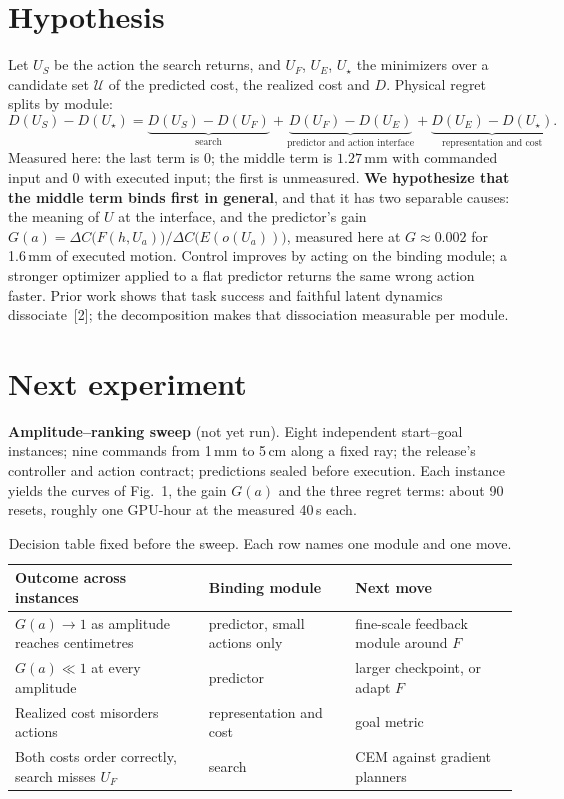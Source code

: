 \documentclass[10pt]{article}
\newcommand{\U}{\mathcal U}
\begin{document}
\section{Hypothesis}
Let $U_S$ be the action the search returns, and $U_F$, $U_E$, $U_\star$ the minimizers over a candidate set $\U$
of the predicted cost, the realized cost and $D$. Physical regret splits by module:
\begin{equation*}
D(U_S)-D(U_\star)=
\underbrace{D(U_S)-D(U_F)}_{\text{search}}
+\underbrace{D(U_F)-D(U_E)}_{\text{predictor and action interface}}
+\underbrace{D(U_E)-D(U_\star)}_{\text{representation and cost}} .
\end{equation*}
Measured here: the last term is $0$; the middle term is $1.27$\,mm with commanded input and $0$ with
executed input; the first is unmeasured. \textbf{We hypothesize that the middle term binds first in general}, and
that it has two separable causes: the meaning of $U$ at the interface, and the predictor's gain $G(a)=\Delta C\big(F(h,U_a)\big)\big/\Delta C\big(E(o(U_a))\big)$, measured here at $G\approx0.002$ for 1.6\,mm of executed motion.
Control improves by acting on the binding module; a stronger optimizer applied to a flat predictor returns
the same wrong action faster. Prior work shows that task success and faithful latent dynamics dissociate~[2];
the decomposition makes that dissociation measurable per module.

\section{Next experiment}
\textbf{Amplitude--ranking sweep} (not yet run). Eight independent start--goal instances; nine commands
from 1\,mm to 5\,cm along a fixed ray; the release's controller and action contract; predictions sealed
before execution. Each instance yields the curves of Fig.~1, the gain $G(a)$ and the three regret terms:
about 90 resets, roughly one GPU-hour at the measured 40\,s each.

\begin{table}[H]\centering\small
\setlength{\tabcolsep}{6pt}\renewcommand{\arraystretch}{1.12}
\begin{tabular}{@{}p{}p{}p{}@{}}
\toprule
Outcome across instances & Binding module & Next move \\
\midrule
$G(a)\to1$ as amplitude reaches centimetres & predictor, small actions only & fine-scale feedback module around $F$ \\
$G(a)\ll1$ at every amplitude & predictor & larger checkpoint, or adapt $F$ \\
Realized cost misorders actions & representation and cost & goal metric \\
Both costs order correctly, search misses $U_F$ & search & CEM against gradient planners \\
\bottomrule
\end{tabular}
\caption{Decision table fixed before the sweep. Each row names one module and one move.}
\end{table}
\end{document}
